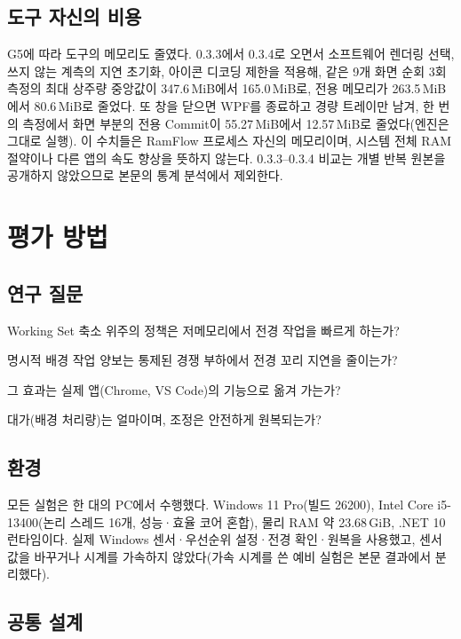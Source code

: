 \documentclass[11pt]{article}
\begin{document}
\subsection{도구 자신의 비용}
\label{sec:selfcost}
G5에 따라 도구의 메모리도 줄였다. 0.3.3에서 0.3.4로 오면서 소프트웨어 렌더링 선택, 쓰지 않는 계측의 지연 초기화, 아이콘 디코딩 제한을 적용해, 같은 9개 화면 순회 3회 측정의 최대 상주량 중앙값이 347.6\,MiB에서 165.0\,MiB로, 전용 메모리가 263.5\,MiB에서 80.6\,MiB로 줄었다. 또 창을 닫으면 WPF를 종료하고 경량 트레이만 남겨, 한 번의 측정에서 화면 부분의 전용 Commit이 55.27\,MiB에서 12.57\,MiB로 줄었다(엔진은 그대로 실행). 이 수치들은 RamFlow 프로세스 자신의 메모리이며, 시스템 전체 RAM 절약이나 다른 앱의 속도 향상을 뜻하지 않는다. 0.3.3--0.3.4 비교는 개별 반복 원본을 공개하지 않았으므로 본문의 통계 분석에서 제외한다.

\section{평가 방법}
\label{sec:method}

\subsection{연구 질문}
\begin{description}[leftmargin=2.6em,style=sameline,itemsep=1pt]
  \item[RQ1] Working Set 축소 위주의 정책은 저메모리에서 전경 작업을 빠르게 하는가?
  \item[RQ2] 명시적 배경 작업 양보는 통제된 경쟁 부하에서 전경 꼬리 지연을 줄이는가?
  \item[RQ3] 그 효과는 실제 앱(Chrome, VS Code)의 기능으로 옮겨 가는가?
  \item[RQ4] 대가(배경 처리량)는 얼마이며, 조정은 안전하게 원복되는가?
\end{description}

\subsection{환경}
모든 실험은 한 대의 PC에서 수행했다. Windows 11 Pro(빌드 26200), Intel Core i5-13400(논리 스레드 16개, 성능·효율 코어 혼합), 물리 RAM 약 23.68\,GiB, .NET 10 런타임이다. 실제 Windows 센서·우선순위 설정·전경 확인·원복을 사용했고, 센서 값을 바꾸거나 시계를 가속하지 않았다(가속 시계를 쓴 예비 실험은 본문 결과에서 분리했다).

\subsection{공통 설계}
\end{document}
